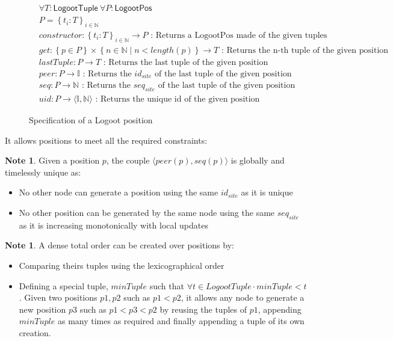 \documentclass{article}
\newcommand{\fnspec}[3]{#1: #2 \text{ : #3}}
\newcommand{\inbb}[1]{\in \mathbb{#1}}
\newcommand{\mathlist}[2]{\set{#1_i: #2}_{i \inbb{N}}}
\newcommand{\set}[1]{\left\{#1\right\}} %
\newcommand{\ssep}{\mid} %
\newcommand{\tuple}[1]{\langle #1 \rangle}
\theoremstyle{definition}
\newcounter{note-counter}
\theoremstyle{definition}
\newtheorem{note}[note-counter]{Note}
\theoremstyle{definition}
\begin{document}
\begin{figure}[h]
    \begin{align*}
    &\forall T: \mathsf{LogootTuple} \ \forall P: \mathsf{LogootPos}\\
    &P = \mathlist{t}{T}\\
    &\fnspec{constructor}{\mathlist{t}{T} \to P}{Returns a LogootPos made of the given tuples}\\
    &\fnspec{get}{\set{p \in P} \times \set{n \inbb{N} \ssep n < length(p)} \to T}{Returns the n-th tuple of the given position}\\
    &\fnspec{lastTuple}{P \to T}{Returns the last tuple of the given position}\\
    &\fnspec{peer}{P \to \mathbb{I}}{Returns the $id_{site}$ of the last tuple of the given position}\\
    &\fnspec{seq}{P \to \mathbb{N}}{Returns the $seq_{site}$ of the last tuple of the given position}\\
    &\fnspec{uid}{P \to \tuple{\mathbb{I}, \mathbb{N}}}{Returns the unique id of the given position}
    \end{align*}
    \caption{Specification of a Logoot position}
    \label{fig:spec-logoot-pos}
\end{figure}

It allows positions to meet all the required constraints:
\begin{note}
    Given a position $p$, the couple $\tuple{peer(p), seq(p)}$ is globally and timelessly unique as:
    \begin{itemize}
        \item No other node can generate a position using the same $id_{site}$ as it is unique
        \item No other position can be generated by the same node using the same $seq_{site}$ as it is increasing monotonically with local updates
    \end{itemize}
\end{note}

\begin{note}
    A dense total order can be created over positions by:
    \begin{itemize}
        \item Comparing theirs tuples using the lexicographical order
        \item Defining a special tuple, $minTuple$ such that $\forall t \in LogootTuple \cdot minTuple < t$.
        Given two positions $p1, p2$ such as $p1 < p2$, it allows any node to generate a new position $p3$ such as $p1 < p3 < p2$ by reusing the tuples of $p1$, appending $minTuple$ as many times as required and finally appending a tuple of its own creation.
    \end{itemize}
\end{note}
\end{document}
